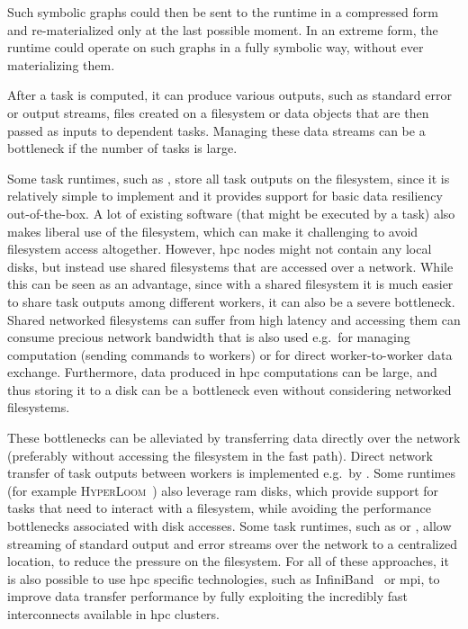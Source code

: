 \begin{description}[wide=0pt]
	Such symbolic graphs could then be sent to the runtime in a compressed form and re-materialized
	only at the last possible moment. In an extreme form, the runtime could operate on such graphs in a
	fully symbolic way, without ever materializing them.
	\item[Data transfers] After a task is computed, it can produce various outputs, such as standard error or output streams,
	files created on a filesystem or data objects that are then passed as inputs to dependent tasks.
	Managing these data streams can be a bottleneck if the number of tasks is large.

	Some task runtimes, such as \snakemake{}, store all task outputs on the filesystem,
	since it is relatively simple to implement and it provides support for basic data resiliency
	out-of-the-box. A lot of existing software (that might be executed by a task) also makes liberal
	use of the filesystem, which can make it challenging to avoid filesystem access altogether.
	However, \gls{hpc} nodes might not contain any local disks, but instead use shared
	filesystems that are accessed over a network. While this can be seen as an advantage, since with a
	shared filesystem it is much easier to share task outputs among different workers, it can also be a
	severe bottleneck. Shared networked filesystems can suffer from high latency and accessing them can
	consume precious network bandwidth that is also used e.g.\ for managing computation (sending
	commands to workers) or for direct worker-to-worker data exchange. Furthermore, data produced in
	\gls{hpc} computations can be large, and thus storing it to a disk can be a
	bottleneck even without considering networked filesystems.

	These bottlenecks can be alleviated by transferring data directly over the network (preferably
	without accessing the filesystem in the fast path). Direct network transfer of task outputs between
	workers is implemented e.g.\ by \dask{}. Some runtimes (for example
	\textsc{HyperLoom}~\cite{hyperloom}) also leverage \gls{ram} disks, which
	provide support for tasks that need to interact with a filesystem, while avoiding the performance
	bottlenecks associated with disk accesses. Some task runtimes, such as \hypershell{} or
	\pegasus{}, allow streaming of standard output and error streams over the network to a
	centralized location, to reduce the pressure on the filesystem. For all of these approaches, it is
	also possible to use \gls{hpc} specific technologies, such as
	InfiniBand~\cite{infiniband} or \gls{mpi}, to improve data transfer performance
	by fully exploiting the incredibly fast interconnects available in \gls{hpc}
	clusters.
\end{description}

